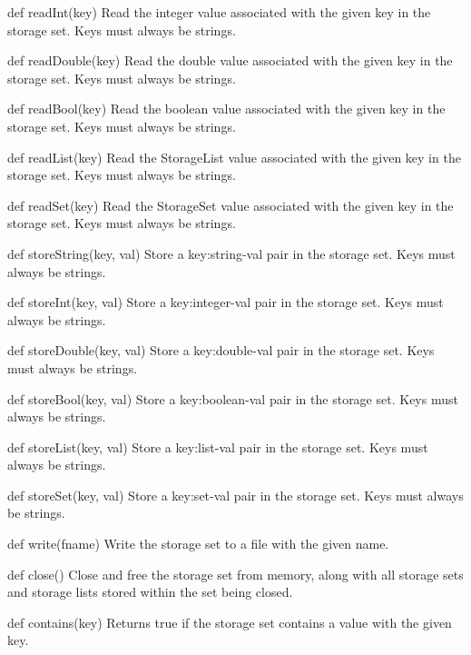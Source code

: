 \documentclass[12pt]{article}
\begin{document}
def readInt(key) \newline
Read the integer value associated with the given key in the storage set. Keys must always be strings.

def readDouble(key) \newline
Read the double value associated with the given key in the storage set. Keys must always be strings.

def readBool(key) \newline
Read the boolean value associated with the given key in the storage set. Keys must always be strings.

def readList(key) \newline
Read the StorageList value associated with the given key in the storage set. Keys must always be strings.

def readSet(key) \newline
Read the StorageSet value associated with the given key in the storage set. Keys must always be strings.

def storeString(key, val) \newline
Store a key:string-val pair in the storage set. Keys must always be strings.

def storeInt(key, val) \newline
Store a key:integer-val pair in the storage set. Keys must always be strings.

def storeDouble(key, val) \newline
Store a key:double-val pair in the storage set. Keys must always be strings.

def storeBool(key, val) \newline
Store a key:boolean-val pair in the storage set. Keys must always be strings.

def storeList(key, val) \newline
Store a key:list-val pair in the storage set. Keys must always be strings.

def storeSet(key, val) \newline
Store a key:set-val pair in the storage set. Keys must always be strings.

def write(fname) \newline
Write the storage set to a file with the given name.

def close() \newline
Close and free the storage set from memory, along with all storage sets and storage lists stored within the set being closed.

def contains(key) \newline
Returns true if the storage set contains a value with the given key.
\end{document}
